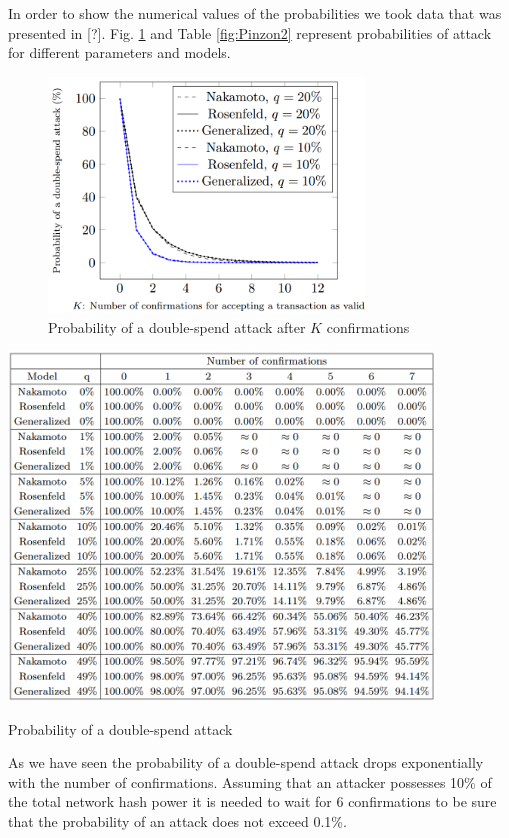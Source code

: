 \documentclass[10pt,a4paper]{article}
\numberwithin{equation}{section} %
\theoremstyle{plain}
\theoremstyle{definition}
\theoremstyle{remark}
\begin{document}
	In order to show the numerical values of the probabilities we took data that was presented in [?]. Fig. \ref{fig:Pinzon1} and Table \ref{fig:Pinzon2} represent probabilities of attack for different parameters and models.
	\begin{figure}[]
            \centering
            \includegraphics[width=0.75\textwidth]{Pinzon1}
            \caption{Probability of a double-spend attack after \(K\) confirmations}
            \label{fig:Pinzon1}
    \end{figure}
    \begin{table}[]
            \centering
            \includegraphics[width=0.85\textwidth]{Pinzon2}
            \caption{Probability of a double-spend attack}
            \label{fig:Pinzon2}
    \end{table}
	
	As we have seen the probability of a double-spend attack drops exponentially with the number of confirmations. Assuming that an attacker possesses 10\% of the total network hash power it is needed to wait for 6 confirmations to be sure that the probability of an attack does not exceed 0.1\%. 
	
\end{document}
